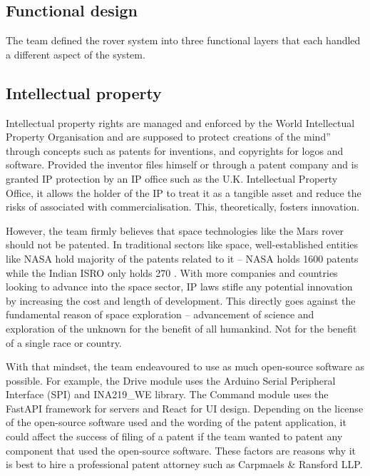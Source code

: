 \documentclass[11pt, a4paper]{article}
\begin{document}
\subsection{Functional design}

The team defined the rover system into three functional layers that each handled a different aspect of the system. 



\pagebreak
\subsection{Intellectual property}

Intellectual property rights are managed and enforced by the World Intellectual Property Organisation and are supposed to protect creations of the mind” through concepts such as patents for inventions, and copyrights for logos and software. Provided the inventor files himself or through a patent company and is granted IP protection by an IP office such as the U.K. Intellectual Property Office, it allows the holder of the IP to treat it as a tangible asset and reduce the risks of associated with commercialisation. This, theoretically, fosters innovation.

However, the team firmly believes that space technologies like the Mars rover should not be patented. In traditional sectors like space, well-established entities like NASA hold majority of the patents related to it – NASA holds 1600\cite{NASA_patents} patents while the Indian ISRO only holds 270 \cite{ISRO_patents}. With more companies and countries looking to advance into the space sector, IP laws stifle any potential innovation by increasing the cost and length of development. This directly goes against the fundamental reason of space exploration – advancement of science and exploration of the unknown for the benefit of all humankind. Not for the benefit of a single race or country.

With that mindset, the team endeavoured to use as much open-source software as possible. For example, the Drive module uses the Arduino  Serial Peripheral Interface (SPI) and INA219\_WE library. The Command module uses the FastAPI framework for servers and React for UI design. Depending on the license of the open-source software used and the wording of the patent application, it could affect the success of filing of a patent if the team wanted to patent any component that used the open-source software. These factors are reasons why it is best to hire a professional patent attorney such as Carpmaels \& Ransford LLP.  
 
\end{document}
